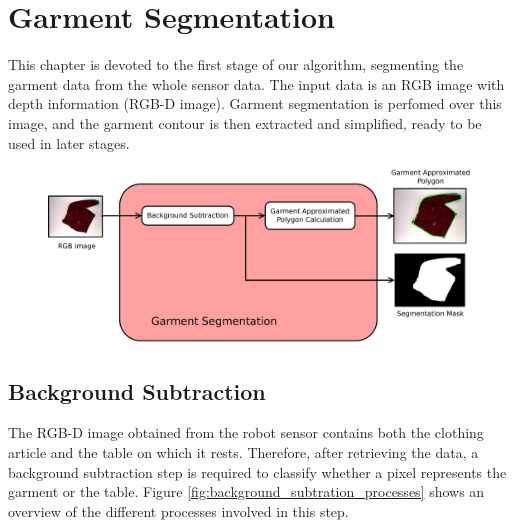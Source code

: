 \chapter{Garment Segmentation}
\label{garment_segmentation}

This chapter is devoted to the first stage of our algorithm, segmenting the garment data from the whole sensor data. The input data is an RGB image with depth information (RGB-D image). Garment segmentation is perfomed over this image, and the garment contour is then extracted and simplified, ready to be used in later stages. 

\begin{figure}[thpb]
    \centering
    \includegraphics[width=\textwidth]
    {figures/Garment-segmentation-diagram.pdf}
    \caption{}
    \label{fig:garment_segmentation_blocks}
\end{figure}


\section{Background Subtraction}
\label{background_subtraction}

The RGB-D image obtained from the robot sensor contains both the clothing article and the table on which it rests. Therefore, after retrieving the data, a background subtraction step is required to classify whether a pixel represents the garment or the table. Figure \ref{fig:background_subtration_processes} shows an overview of the different processes involved in this step.


